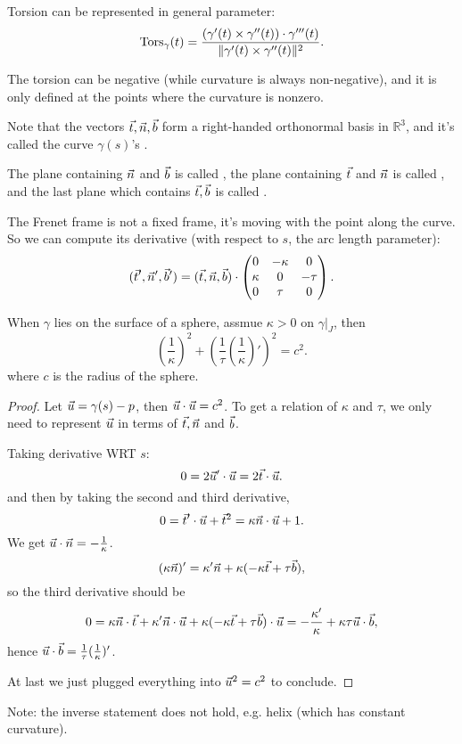 \begin{proposition}
	Torsion can be represented in general parameter:
	\[
	\operatorname{Tors}_\gamma(t) = \frac{(\gamma'(t)\times \gamma''(t))\cdot \gamma'''(t)}
	{\lVert \gamma'(t)\times \gamma''(t) \rVert^2 }.
	\]
\end{proposition}
\begin{remark}
    The torsion can be negative (while curvature is always non-negative),
	and it is only defined at the points where the curvature is nonzero.
\end{remark}

Note that the vectors $\vec{t},\vec{n},\vec{b}$ form a right-handed
orthonormal basis in $\mathbb{R}^3$, and it's called the curve
$\gamma(s)$'s .

The plane containing $\vec{n}$ and $\vec{b}$ is called ,
the plane containing $\vec{t}$ and $\vec{n}$ is called ,
and the last plane which contains $\vec{t},\vec{b}$ is called .

The Frenet frame is not a fixed frame, it's moving with the point along the curve.
So we can compute its derivative (with respect to $s$, the arc length parameter):
\[
	(\vec{t}',\vec{n}',\vec{b}') = (\vec{t}, \vec{n}, \vec{b})\cdot
	\begin{pmatrix}
		0&-\kappa&0\\ \kappa&0&-\tau\\0&\tau&0
	\end{pmatrix}.
\]
\begin{example}
    When $\gamma$ lies on the surface of a sphere, assmue
	$\kappa>0$ on  $\gamma\big|_J$, then
	\[
		\left(\frac{1}{\kappa}\right)^2 +
		\left(\frac{1}{\tau}\left(\frac{1}{\kappa}\right)'\right)^2 = c^2.
	\]
	where $c$ is the radius of the sphere.
	\begin{proof}[Proof]
		Let $\vec{u} = \gamma(s) - p$,
		then $\vec{u}\cdot\vec{u} = c^2$.
		To get a relation of $\kappa$ and  $\tau$, we only need to
		represent $\vec{u}$ in terms of $\vec{t},\vec{n}$ and $\vec{b}$.

		Taking derivative WRT $s$:
		\[
		0 = 2\vec{u}'\cdot\vec{u} = 2\vec{t}\cdot\vec{u}.
		\]
		and then by taking the second and third derivative,
		\[
		0 = \vec{t}'\cdot\vec{u} + \vec{t}^2 = \kappa\vec{n} \cdot \vec{u} + 1.
		\]
		We get $\vec{u}\cdot\vec{n}  = -\frac{1}{\kappa}$.
		\[
			(\kappa\vec{n})' = \kappa'\vec{n} + \kappa(-\kappa\vec{t} + \tau\vec{b}),
		\]
		so the third derivative should be
		\[
		0 = \kappa\vec{n}\cdot\vec{t} +
		\kappa'\vec{n}\cdot\vec{u} +
		\kappa(-\kappa\vec{t} + \tau\vec{b})\cdot\vec{u}
		= -\frac{\kappa'}{\kappa} + \kappa\tau\vec{u}\cdot\vec{b},
		\]
		hence $\vec{u}\cdot\vec{b} = \frac{1}{\tau}(\frac{1}{\kappa})'$.

		At last we just plugged everything into $\vec{u}^2 = c^2$ to conclude.
	\end{proof}

	Note: the inverse statement does not hold, e.g. helix
	(which has constant curvature).
\end{example}

